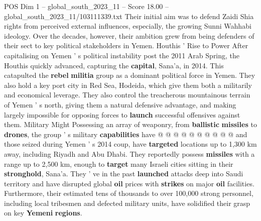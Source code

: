 \begin{textsample}{POS Dim 1 – global\_south\_2023\_11 – Score 18.00 – global\_south\_2023\_11/103111339.txt}
Their initial aim was to defend Zaidi Shia rights from perceived external influences, especially, the growing Sunni Wahhabi ideology.
Over the decades, however, their ambition grew from being defenders of their sect to key political stakeholders in Yemen.
Houthis ' Rise to Power After capitalising on Yemen ' s political instability post the 2011 Arab Spring, the Houthis quickly advanced, capturing the \textbf{capital}, Sana'a, in 2014.
This catapulted the \textbf{rebel} \textbf{militia} group as a dominant political force in Yemen.
They also hold a key port city in Red Sea, Hodeida, which give them both a militarily and economical leverage.
They also control the treacherous mountainous terrain of Yemen ' s north, giving them a natural defensive advantage, and making largely impossible for opposing forces to \textbf{launch} successful offensives against them.
Military Might Possessing an array of weaponry, from \textbf{ballistic} \textbf{missiles} to \textbf{drones}, the group ' s military \textbf{capabilities} have @ @ @ @ @ @ @ @ @ @ and those seized during Yemen ' s 2014 coup, have \textbf{targeted} locations up to 1,300 km away, including Riyadh and Abu Dhabi.
They reportedly possess \textbf{missiles} with a range up to 2,500 km, enough to \textbf{target} many Israeli cities sitting in their \textbf{stronghold}, Sana'a.
They ' ve in the past \textbf{launched} attacks deep into Saudi territory and have disrupted global \textbf{oil} prices with \textbf{strikes} on major \textbf{oil} facilities.
Furthermore, their estimated tens of thousands to over 100,000 strong personnel, including local tribesmen and defected military units, have solidified their grasp on key \textbf{Yemeni} \textbf{regions}.

\end{textsample}
